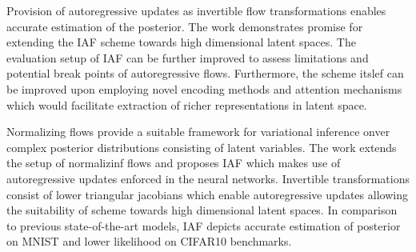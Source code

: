 \documentclass[11pt,letterpaper]{article}
\begin{document}
Provision of autoregressive updates as invertible flow transformations enables accurate estimation of the posterior. The work demonstrates promise for extending the IAF scheme towards high dimensional latent spaces. The evaluation setup of IAF can be further improved to assess limitations and potential break points of autoregressive flows. Furthermore, the scheme itslef can be improved upon employing novel encoding methods and attention mechanisms which would facilitate extraction of richer representations in latent space.

Normalizing flows provide a suitable framework for variational inference onver complex posterior distributions consisting of latent variables. The work extends the setup of normalizinf flows and proposes IAF which makes use of autoregressive updates enforced in the neural networks. Invertible transformations consist of lower triangular jacobians which enable autoregressive updates allowing the suitability of scheme towards high dimensional latent spaces. In comparison to previous state-of-the-art models, IAF depicts accurate estimation of posterior on MNIST and lower likelihood on CIFAR10 benchmarks.
\end{document}
